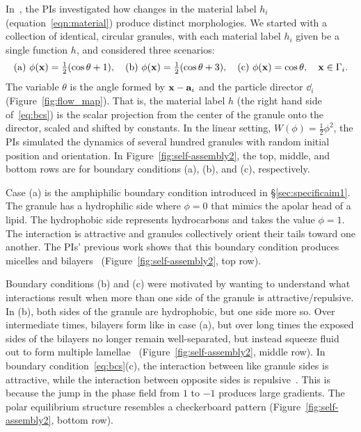 In~\cite{fu-ryh-qua-you2022}, the PIs investigated how changes in the
material label $h_i$ (equation~\eqref{eqn:material}) produce distinct
morphologies. We started with a collection of identical, circular
granules, with each material label $h_i$ given be a single function $h$,
and considered three scenarios:
\begin{equation}
  \label{eq:bcs}
   \text{(a) }  \phi(\mathbf{x}) = \tfrac{1}{2}(\cos \theta + 1),\quad
   \text{(b)  } \phi(\mathbf{x}) = \tfrac{1}{2}(\cos \theta + 3),\quad
   \text{(c) }  \phi(\mathbf{x}) = \cos \theta, \quad \mathbf{x} \in \Gamma_i.
\end{equation}
The variable $\theta$ is the angle formed by $\mathbf{x}-\mathbf{a}_i$ and the
particle director $\dd_i$ (Figure~\ref{fig:flow_map}). That is, the
material label $h$ (the right hand side of~\eqref{eq:bcs}) is the scalar
projection from the center of the granule onto the director, scaled and
shifted by constants. In the linear setting, $W(\phi) =
\tfrac{1}{2}\phi^2$, the PIs simulated the dynamics of several hundred
granules with random initial position and orientation. In
Figure~\ref{fig:self-assembly2}, the top, middle, and bottom rows are
for boundary conditions (a), (b), and (c), respectively. 

Case (a) is the amphiphilic boundary condition introduced in
\S\ref{sec:specificaim1}. The granule has a hydrophilic side where $\phi
= 0$ that mimics the apolar head of a lipid. The hydrophobic side
represents hydrocarbons and takes the value $\phi = 1$. The interaction
is attractive and granules collectively orient their tails toward one
another. The PIs' previous work shows that this boundary condition
produces micelles and bilayers~\cite{Fu2018_SIAM}
(Figure~\ref{fig:self-assembly2}, top row).

Boundary conditions (b) and (c) were motivated by wanting to understand
what interactions result when more than one side of the granule is
attractive/repulsive. In (b), both sides of the granule are hydrophobic,
but one side more so. Over intermediate times, bilayers form like in
case (a), but over long times the exposed sides of the bilayers no
longer remain well-separated, but instead squeeze fluid out to form
multiple lamellae~\cite{Huetal19, deMeetal21}
(Figure~\ref{fig:self-assembly2}, middle row). In boundary
condition~\eqref{eq:bcs}(c), the interaction between like granule sides
is attractive, while the interaction between opposite sides is
repulsive~\cite{MaRa76, Ma77}. This is because the jump in the phase
field from $1$ to $-1$ produces large gradients. The polar equilibrium
structure resembles a checkerboard pattern (Figure~\ref{fig:self-assembly2}, bottom row).

